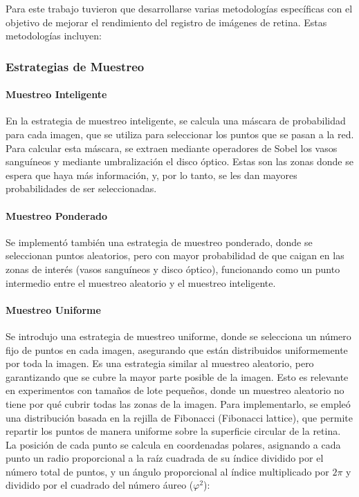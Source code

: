 Para este trabajo tuvieron que desarrollarse varias metodologías específicas con el objetivo de mejorar el rendimiento del registro de imágenes de retina. Estas metodologías incluyen:

\subsubsection{Estrategias de Muestreo}
\label{subsubsec:estratexias_mostraxe}

\paragraph{Muestreo Inteligente}
En la estrategia de muestreo inteligente, se calcula una máscara de probabilidad para cada imagen, que se utiliza para seleccionar los puntos que se pasan a la red. Para calcular esta máscara, se extraen mediante operadores de Sobel los vasos sanguíneos y mediante umbralización el disco óptico. Estas son las zonas donde se espera que haya más información, y, por lo tanto, se les dan mayores probabilidades de ser seleccionadas.

\paragraph{Muestreo Ponderado}
Se implementó también una estrategia de muestreo ponderado, donde se seleccionan puntos aleatorios, pero con mayor probabilidad de que caigan en las zonas de interés (vasos sanguíneos y disco óptico), funcionando como un punto intermedio entre el muestreo aleatorio y el muestreo inteligente.

\paragraph{Muestreo Uniforme}
Se introdujo una estrategia de muestreo uniforme, donde se selecciona un número fijo de puntos en cada imagen, asegurando que están distribuidos uniformemente por toda la imagen. Es una estrategia similar al muestreo aleatorio, pero garantizando que se cubre la mayor parte posible de la imagen. Esto es relevante en experimentos con tamaños de lote pequeños, donde un muestreo aleatorio no tiene por qué cubrir todas las zonas de la imagen. Para implementarlo, se empleó una distribución basada en la rejilla de Fibonacci (Fibonacci lattice), que permite repartir los puntos de manera uniforme sobre la superficie circular de la retina. La posición de cada punto se calcula en coordenadas polares, asignando a cada punto un radio proporcional a la raíz cuadrada de su índice dividido por el número total de puntos, y un ángulo proporcional al índice multiplicado por $2\pi$ y dividido por el cuadrado del número áureo ($\varphi^2$):

